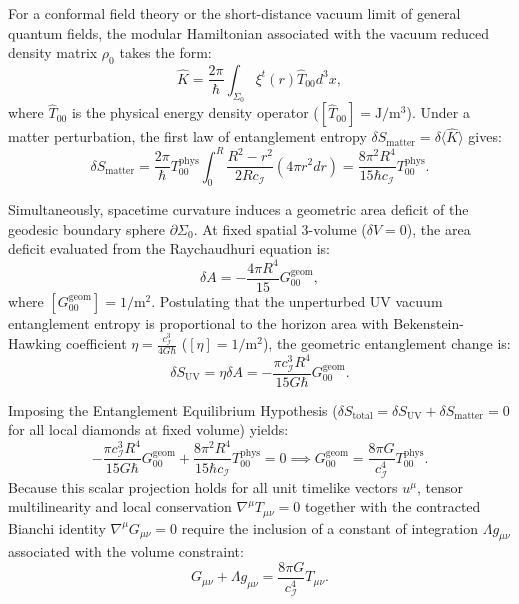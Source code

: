 \documentclass[11pt,a4paper]{article}
\begin{document}
For a conformal field theory or the short-distance vacuum limit of general quantum fields, the modular Hamiltonian associated with the vacuum reduced density matrix $\rho_0$ takes the form:
\begin{equation}
\hat{K} = \frac{2\pi}{\hbar} \int_{\Sigma_0} \xi^t(r) \hat{T}_{00} d^3x,
\end{equation}
where $\hat{T}_{00}$ is the physical energy density operator ($[\hat{T}_{00}] = \text{J}/\text{m}^3$). Under a matter perturbation, the first law of entanglement entropy $\delta S_{\text{matter}} = \delta \langle \hat{K} \rangle$ gives:
\begin{equation}
\delta S_{\text{matter}} = \frac{2\pi}{\hbar} T_{00}^{\text{phys}} \int_0^R \frac{R^2 - r^2}{2 R c_{\mathcal{I}}} (4\pi r^2 dr) = \frac{8\pi^2 R^4}{15 \hbar c_{\mathcal{I}}} T_{00}^{\text{phys}}.
\end{equation}

Simultaneously, spacetime curvature induces a geometric area deficit of the geodesic boundary sphere $\partial \Sigma_0$. At fixed spatial 3-volume ($\delta V = 0$), the area deficit evaluated from the Raychaudhuri equation is:
\begin{equation}
\delta A = -\frac{4\pi R^4}{15} G_{00}^{\text{geom}},
\end{equation}
where $[G_{00}^{\text{geom}}] = 1/\text{m}^2$. Postulating that the unperturbed UV vacuum entanglement entropy is proportional to the horizon area with Bekenstein-Hawking coefficient $\eta = \frac{c_{\mathcal{I}}^3}{4 G \hbar}$ ($[\eta] = 1/\text{m}^2$), the geometric entanglement change is:
\begin{equation}
\delta S_{\text{UV}} = \eta \delta A = -\frac{\pi c_{\mathcal{I}}^3 R^4}{15 G \hbar} G_{00}^{\text{geom}}.
\end{equation}

Imposing the Entanglement Equilibrium Hypothesis ($\delta S_{\text{total}} = \delta S_{\text{UV}} + \delta S_{\text{matter}} = 0$ for all local diamonds at fixed volume) yields:
\begin{equation}
-\frac{\pi c_{\mathcal{I}}^3 R^4}{15 G \hbar} G_{00}^{\text{geom}} + \frac{8\pi^2 R^4}{15 \hbar c_{\mathcal{I}}} T_{00}^{\text{phys}} = 0 \implies G_{00}^{\text{geom}} = \frac{8\pi G}{c_{\mathcal{I}}^4} T_{00}^{\text{phys}}.
\end{equation}
Because this scalar projection holds for all unit timelike vectors $u^\mu$, tensor multilinearity and local conservation $\nabla^\mu T_{\mu\nu} = 0$ together with the contracted Bianchi identity $\nabla^\mu G_{\mu\nu} = 0$ require the inclusion of a constant of integration $\Lambda g_{\mu\nu}$ associated with the volume constraint:
\begin{equation}
\boxed{G_{\mu\nu} + \Lambda g_{\mu\nu} = \frac{8\pi G}{c_{\mathcal{I}}^4} T_{\mu\nu}.}
\end{equation}
\end{document}
